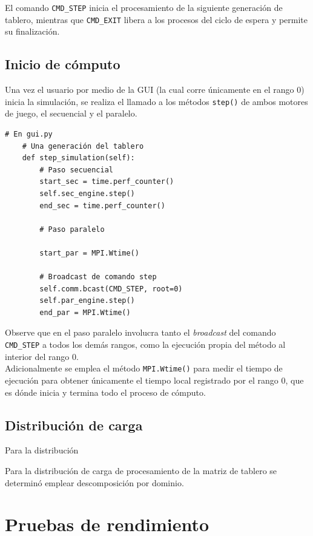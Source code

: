 \documentclass{article}
\begin{document}
El comando \verb|CMD_STEP| inicia el procesamiento de la siguiente generación de tablero, mientras que \verb|CMD_EXIT| libera a los procesos del ciclo de espera y permite su finalización.

\subsection{Inicio de cómputo}

Una vez el usuario por medio de la GUI (la cual corre únicamente en el rango 0) inicia la simulación, se realiza el llamado a los métodos \verb|step()| de ambos motores de juego, el secuencial y el paralelo. 

\begin{verbatim}
# En gui.py
    # Una generación del tablero
    def step_simulation(self):
        # Paso secuencial
        start_sec = time.perf_counter()
        self.sec_engine.step()
        end_sec = time.perf_counter()

        # Paso paralelo
        
        start_par = MPI.Wtime()

        # Broadcast de comando step
        self.comm.bcast(CMD_STEP, root=0)
        self.par_engine.step()
        end_par = MPI.Wtime()

\end{verbatim}

Observe que en el paso paralelo involucra tanto el \textit{broadcast} del comando \verb|CMD_STEP| a todos los demás rangos, como la ejecución propia del método al interior del rango 0.\\

Adicionalmente se emplea el método \verb|MPI.Wtime()| para medir el tiempo de ejecución para obtener únicamente el tiempo local registrado por el rango 0, que es dónde inicia y termina todo el proceso de cómputo.\\

\subsection{Distribución de carga}

Para la distribución 

Para la distribución de carga de procesamiento de la matriz de tablero se determinó emplear descomposición por dominio.

\section{Pruebas de rendimiento}
\end{document}
